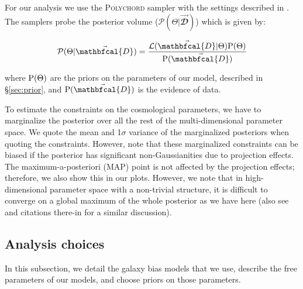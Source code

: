 \documentclass[aps, prd,twocolumn,superscriptaddress,nofootinbib,preprintnumbers]{revtex4-1}
\begin{document}
For our analysis we use the \textsc{Polychord} sampler with the settings described in \cite{y3-samplers}. The samplers probe the posterior volume ($\mathcal{P}(\Theta | \vec{\mathbfcal{D}})$) which is given by:
\begin{linenomath*}
\begin{equation}
    \mathcal{P}(\Theta | \vec{\mathbfcal{D}}) = \frac{\mathcal{L}(\vec{\mathbfcal{D}}|\Theta) {\rm P}(\Theta)}{{\rm P}(\vec{\mathbfcal{D}})}
\end{equation}
\end{linenomath*}
where ${\rm P}(\Theta)$ are the priors on the parameters of our model, described in \S\ref{sec:prior}, and ${\rm P}(\vec{\mathbfcal{D}})$ is the evidence of data. 

To estimate the constraints on the cosmological parameters, we have to marginalize the posterior over all the rest of the multi-dimensional parameter space. We quote the mean and 1$\sigma$ variance of the marginalized posteriors when quoting the constraints. However, note that these marginalized constraints can be biased if the posterior has significant non-Gaussianities due to projection effects. The maximum-a-posteriori (MAP) point is not affected by the projection effects; therefore, we also show this in our plots. However, we note that in high-dimensional parameter space with a non-trivial structure, it is difficult to converge on a global maximum of the whole posterior as we have here (also see \citet{Joachimi_2021} and citations there-in for a similar discussion).


\subsection{Analysis choices}
\label{sec:analysis_choices}
In this subsection, we detail the galaxy bias models that we use, describe the free parameters of our models, and choose priors on those parameters. 
\end{document}
